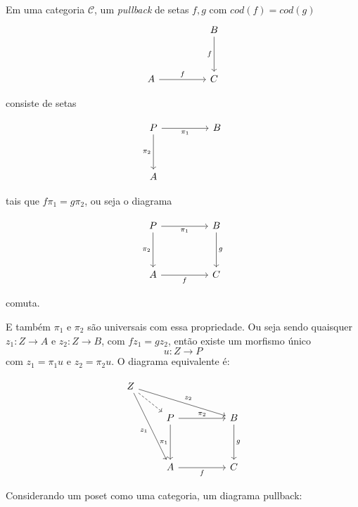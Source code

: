 \documentclass[../main.tex]{subfiles}
\begin{document}
\begin{definition}\cite{awodey2010}
    Em uma categoria $\mathcal{C}$, um \emph{pullback} de setas $f, g$ com $cod (f) = cod (g)$
    \[\begin{tikzcd}
        && B \\
        \\
        A && C
        \arrow["f"', from=1-3, to=3-3]
        \arrow["f", from=3-1, to=3-3]
    \end{tikzcd}\]

    consiste de setas

    \[\begin{tikzcd}
        P && B \\
        \\
        A
        \arrow["{\pi_1}"', from=1-1, to=1-3]
        \arrow["{\pi_2}"', from=1-1, to=3-1]
    \end{tikzcd}\]

    tais que $f \pi_1 = g \pi_2$, ou seja o diagrama

    \[\begin{tikzcd}
        P && B \\
        \\
        A && C
        \arrow["{\pi_1}"', from=1-1, to=1-3]
        \arrow["{\pi_2}"', from=1-1, to=3-1]
        \arrow["g", from=1-3, to=3-3]
        \arrow["f"', from=3-1, to=3-3]
    \end{tikzcd}\]

    comuta.
    
    E também $\pi_1$ e $\pi_2$ são universais com essa propriedade. Ou seja sendo quaisquer $z_1 : Z \to A$ e $z_2 : Z \to B$, com $fz_1 = gz_2$, então existe um morfismo único $$u : Z \to P$$ com $z_1 = \pi_1 u$ e $z_2 = \pi_2 u$. O diagrama equivalente é:

    \[\begin{tikzcd}
        Z \\
        & P && B \\
        \\
        & A && C
        \arrow[dashed, from=1-1, to=2-2]
        \arrow["{z_2}", from=1-1, to=2-4]
        \arrow["{z_1}"', from=1-1, to=4-2]
        \arrow["{\pi_2}", from=2-2, to=2-4]
        \arrow["{\pi_1}"', from=2-2, to=4-2]
        \arrow["g", from=2-4, to=4-4]
        \arrow["f"', from=4-2, to=4-4]
    \end{tikzcd}\]
\end{definition}

Considerando um poset como uma categoria, um diagrama pullback:
\end{document}
